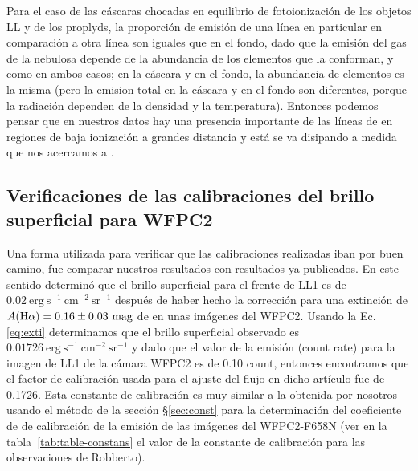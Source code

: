 Para el caso de las cáscaras chocadas en equilibrio de fotoionización de los objetos LL y de los proplyds, la proporción de emisión de una línea en particular en comparación a otra línea son iguales que en el fondo, dado que la emisión del gas de la nebulosa  depende de la abundancia de los elementos que la conforman, y como en ambos casos; en la cáscara y en el fondo, la abundancia de elementos es la misma (pero la emision total en la cáscara y en el fondo son diferentes, porque la radiación dependen de la densidad y la temperatura). Entonces podemos pensar que en nuestros datos hay una presencia importante de las líneas de \nii{} en regiones de baja ionización a grandes distancia y está se va disipando a medida que nos acercamos a \thC{}.  \\

\subsection{Verificaciones de las calibraciones del brillo superficial para WFPC2}
\label{sec:verifi}

Una forma utilizada para verificar que las calibraciones realizadas iban por buen camino, fue comparar nuestros resultados con  resultados ya publicados. En este sentido \citet{Henney:2013a} determinó que el brillo superficial para el frente de LL1 es de \(0.02\ \mathrm{erg\ s^{-1}\ cm^{-2}\ sr^{-1}}\) después de haber hecho la corrección para una extinción de \(A(\mathrm{H}\alpha{}) = 0.16 \pm 0.03\ \text{mag}\) de \ha{} en unas imágenes del WFPC2. Usando la Ec. \ref{eq:exti} determinamos que el brillo superficial observado es \(0.01726~\mathrm{erg\ s^{-1}\ cm^{-2}\ sr^{-1}}\) y dado que el valor de la emisión (count rate) para la imagen de LL1 de la cámara WFPC2 es de 0.10 count, entonces encontramos que el factor de calibración usada para el ajuste del flujo en dicho artículo fue de  0.1726. Esta constante de calibración es muy similar a la obtenida por nosotros usando el método de la sección \S\ref{sec:const} para la determinación del coeficiente de de calibración de la emisión de las imágenes del WFPC2-F658N (ver en la tabla~\ref{tab:table-constans} el valor de la constante de calibración para las observaciones de Robberto).      

%

%
